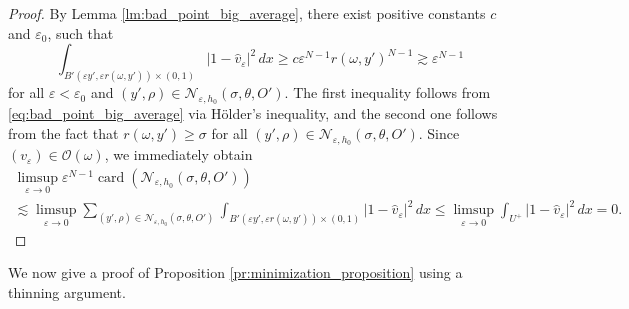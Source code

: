 \documentclass{article}
\numberwithin{equation}{section}
\theoremstyle{definition}
\theoremstyle{remark}
\newcommand{\card}{\operatorname{card}}
\begin{document}
\begin{proof}
    By Lemma \ref{lm:bad_point_big_average}, there exist positive constants $c$ and $\varepsilon_0$, such that
    \[
    \int_{B'(\varepsilon y', \varepsilon r(\omega, y')) \times (0, 1)} |1 - \hat{v}_\varepsilon|^2 \, dx \ge c \varepsilon^{N - 1} r(\omega, y')^{N - 1} \gtrsim \varepsilon^{N - 1}
    \]
    for all $\varepsilon < \varepsilon_0$ and $(y', \rho) \in \mathcal{N}_{\varepsilon, h_0}(\sigma, \theta, O')$. The first inequality follows from \eqref{eq:bad_point_big_average} via Hölder's inequality, and the second one follows from the fact that $r(\omega, y') \ge \sigma$ for all $(y', \rho) \in \mathcal{N}_{\varepsilon, h_0}(\sigma, \theta, O')$. Since $(v_\varepsilon) \in \mathcal{O}(\omega)$, we immediately obtain
    \begin{multline*}
        \limsup_{\varepsilon \to 0} \varepsilon^{N - 1} \card\left(\mathcal{N}_{\varepsilon, h_0}(\sigma, \theta, O')\right) \\
        \lesssim \limsup_{\varepsilon \to 0} \sum_{(y', \rho) \in \mathcal{N}_{\varepsilon, h_0}(\sigma, \theta, O')} \int_{B'(\varepsilon y', \varepsilon r(\omega, y')) \times (0, 1)} |1 - \hat{v}_\varepsilon|^2 \, dx \le \limsup_{\varepsilon \to 0} \int_{U^+} |1 - \hat{v}_\varepsilon|^2 \, dx = 0.
    \end{multline*}
\end{proof}

We now give a proof of Proposition \ref{pr:minimization_proposition} using a thinning argument.
\end{document}
